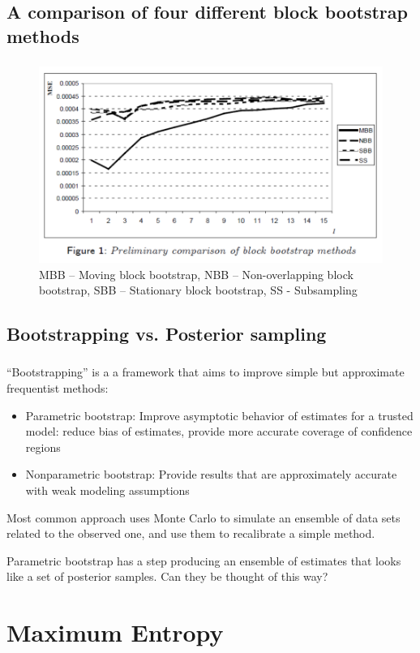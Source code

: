 \documentclass[c, dvipsnames]{beamer}  %
\begin{document}
\subsection{A comparison of four different block bootstrap methods}

\begin{frame}[shrink=5]
\frametitle{\insertsection} 
\framesubtitle{\insertsubsection}




\begin{figure}
	\centering
	\includegraphics[width=0.7\linewidth]{screenshot008}
	\caption{MBB – Moving block bootstrap, 
		NBB – Non-overlapping block bootstrap, 
		SBB – Stationary block bootstrap, 
		SS - Subsampling }
	\label{fig:screenshot008}
\end{figure}

\end{frame}




\subsection{Bootstrapping vs. Posterior sampling}

\begin{frame}[shrink=5]
\frametitle{\insertsection} 
\framesubtitle{\insertsubsection}

“Bootstrapping” is a a framework that aims to improve simple but approximate frequentist methods:

\begin{itemize}
	\item Parametric bootstrap: Improve asymptotic behavior of
estimates for a trusted model: reduce bias of estimates,
provide more accurate coverage of confidence regions

\item Nonparametric bootstrap: Provide results that are
approximately accurate with weak modeling assumptions

\end{itemize}

Most common approach uses Monte Carlo to simulate an ensemble
of data sets related to the observed one, and use them to
recalibrate a simple method.

Parametric bootstrap has a step producing an ensemble of
estimates that looks like a set of posterior samples. Can they be
thought of this way?

\end{frame}




\section{Maximum Entropy}
\end{document}
